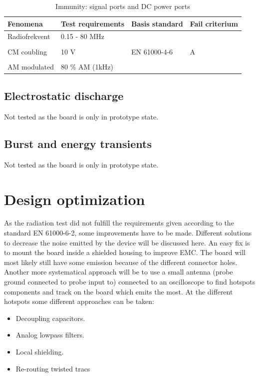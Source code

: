 \begin{table}[H]
		\begin{center}
		\begin{tabular}{|l|l|l|l|}\hline
			Fenomena 		& Test requirements		& Basis standard 	& Fail criterium	\\\hline
			Radiofrekvent		& 0.15 - 80 MHz		& 				& 			\\
							&					&				&			\\
			CM coubling		& 10 V				& EN 61000-4-6	& A			\\
							&					&				&			\\
			AM modulated		& 80 \% AM (1kHz)		& 				&			\\\hline
		\end{tabular}
		\end{center}
	\caption{Immunity: signal ports and DC power ports}
\end{table}

\subsection{Electrostatic discharge}
Not tested as the board is only in prototype state.

\subsection{Burst and energy transients}
Not tested as the board is only in prototype state.

\section{Design optimization}\label{sec:design_optimization}
As the radiation test did not fulfill the requirements given according to the standard EN 61000-6-2, some improvements have to be made. Different solutions to decrease the noise emitted by the device will be discussed here.
\p An easy fix is to mount the board inside a shielded housing to improve EMC. The board will most likely still have some emission because of the different connector holes.
\p Another more systematical approach will be to use a small antenna (probe ground connected to probe input to) connected to an oscilloscope to find hotspots components and track on the board which emits the most. At the different hotspots some different approaches can be taken:
\begin{itemize}
	\item Decoupling capacitors.
	\item Analog lowpass filters.
	\item Local shielding.
	\item Re-routing twisted tracs	
\end{itemize} 





